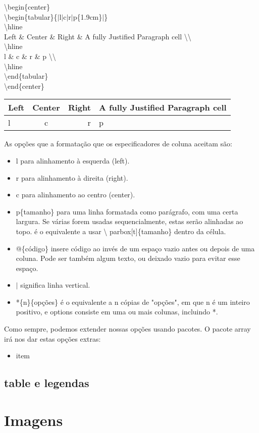 \noindent\textbackslash begin\{center\}\\
\textbackslash begin\{tabular\}\{$|$l$|$c$|$r$|$p\{1.9cm\}$|$\}\\
	\textbackslash hline\\
	Left \& Center \& Right \& A fully Justified Paragraph cell \textbackslash \textbackslash \\
	\textbackslash hline\\
	l \& c \& r \& p \textbackslash \textbackslash \\
	\textbackslash hline\\
\textbackslash end\{tabular\}\\
\textbackslash end\{center\}\\

\begin{center}
\begin{tabular}{|l|c|r|p{1.9cm}|}
	\hline
	Left & Center & Right & A fully Justified Paragraph cell \\
	\hline
	l & c & r & p \\
	\hline
\end{tabular}
\end{center}

As opções que a formatação que os especificadores de coluna aceitam são:

\begin{itemize}
	\item l para alinhamento à esquerda (left).
	\item r para alinhamento à direita (right).
	\item c para alinhamento ao centro (center).
	\item p\{tamanho\} para uma linha formatada como parágrafo, com uma
		certa largura. Se várias forem usadas sequencialmente, estas
		serão alinhadas ao topo. é o equivalente a usar \textbackslash
		parbox[t]\{tamanho\} dentro da célula.  \item @\{código\}
		insere código ao invés de um espaço vazio antes ou depois de
		uma coluna. Pode ser também algum texto, ou deixado vazio para
		evitar esse espaço.
	\item $|$ significa linha vertical.
	\item *\{n\}\{opções\} é o equivalente a n cópias de "opções", em que n
		é um inteiro positivo, e options consiste em uma ou mais
		colunas, incluindo *.
\end{itemize}

Como sempre, podemos extender nossas opções usando pacotes. O pacote array irá
nos dar estas opções extras:

\begin{itemize}
	\item item
\end{itemize}



\subsection{table e legendas}


\section{Imagens}

\newpage
